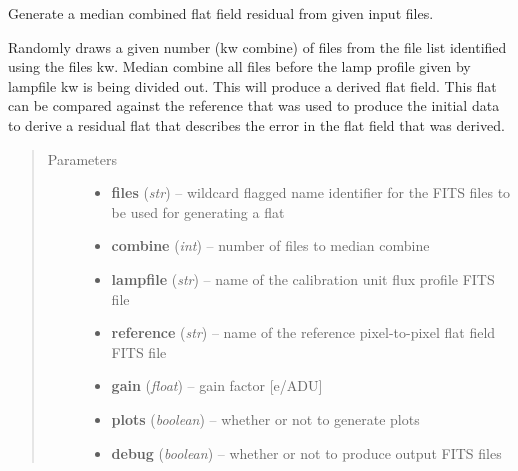 \documentclass[a4paper,11pt,english]{sphinxmanual}
\begin{document}

\begin{fulllineitems}
\label{reduction:analysis.FlatfieldCalibration.generateResidualFlatField}
Generate a median combined flat field residual from given input files.

Randomly draws a given number (kw combine) of files from the file list identified using the files kw.
Median combine all files before the lamp profile given by lampfile kw is being divided out. This
will produce a derived flat field. This flat can be compared against the reference that was used
to produce the initial data to derive a residual flat that describes the error in the flat field
that was derived.
\begin{quote}\begin{description}
\item[{Parameters}] \leavevmode\begin{itemize}
\item {} 
\textbf{files} (\emph{str}) -- wildcard flagged name identifier for the FITS files to be used for generating a flat

\item {} 
\textbf{combine} (\emph{int}) -- number of files to median combine

\item {} 
\textbf{lampfile} (\emph{str}) -- name of the calibration unit flux profile FITS file

\item {} 
\textbf{reference} (\emph{str}) -- name of the reference pixel-to-pixel flat field FITS file

\item {} 
\textbf{gain} (\emph{float}) -- gain factor {[}e/ADU{]}

\item {} 
\textbf{plots} (\emph{boolean}) -- whether or not to generate plots

\item {} 
\textbf{debug} (\emph{boolean}) -- whether or not to produce output FITS files

\end{itemize}


\end{description}
\end{quote}
\end{fulllineitems}
\end{document}
